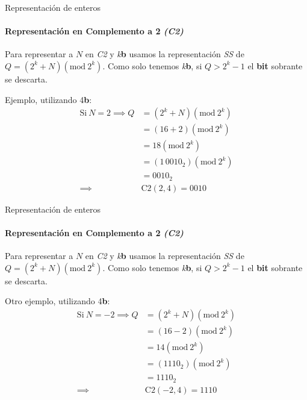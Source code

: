 \documentclass[11pt,a4paper,spanish]{beamer}
\newcommand{\bit}{\textbf{b}}
\begin{document}
\begin{frame}{Representación de enteros}
    \framesubtitle{Representación en Complemento a 2 \emph{(C2)}}

    Para representar a \(N\) en \emph{C2} y \emph{k}\bit{} usamos la
    representación \emph{SS} de \(Q=(2^{k}+N)(\text{mod}~2^{k})\). Como solo
    tenemos \emph{k}\bit{}, si \(Q>2^{k}-1\) el \textbf{bit} sobrante se
    descarta.

    \pause
    Ejemplo, utilizando 4\bit{}:
    \pause
    \[
        \begin{split}
            \text{Si}~ N=2 \implies Q&=(2^{k}+N)(\text{mod}~2^{k})\\
            &=(16+2)(\text{mod}~2^{k})\\
            &= 18(\text{mod}~2^{k})\\
            &=(1\,0010_{2})(\text{mod}~2^{k})\\
            &= 0010_{2}\\
            \implies & \text{C2}(2,4) = 0010
        \end{split}
    \]

\end{frame}

\begin{frame}{Representación de enteros}
    \framesubtitle{Representación en Complemento a 2 \emph{(C2)}}

    Para representar a \(N\) en \emph{C2} y \emph{k}\bit{} usamos la
    representación \emph{SS} de \(Q=(2^{k}+N)(\text{mod}~2^{k})\). Como solo
    tenemos \emph{k}\bit{}, si \(Q>2^{k}-1\) el \textbf{bit} sobrante se
    descarta.

    Otro ejemplo, utilizando 4\bit{}:
    \pause
    \[
        \begin{split}
            \text{Si}~ N=-2 \implies Q&=(2^{k}+N)(\text{mod}~2^{k})\\
            &=(16-2)(\text{mod}~2^{k})\\
            &= 14(\text{mod}~2^{k})\\
            &=(1110_{2})(\text{mod}~2^{k})\\
            &= 1110_{2}\\
            \implies & \text{C2}(-2,4) = 1110
        \end{split}
    \]

\end{frame}
\end{document}
